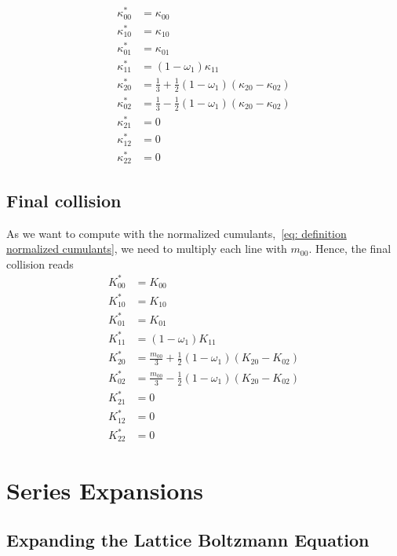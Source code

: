 \documentclass{article}
\begin{document}
\begin{equation}
  \begin{aligned}
    \kappa_{00}^{*} & = \kappa_{00} \\
    \kappa_{10}^{*} & = \kappa_{10} \\
    \kappa_{01}^{*} & = \kappa_{01} \\
    \kappa_{11}^{*} & = (1-\omega_1)\kappa_{11} \\
    \kappa_{20}^{*} & = \frac{1}{3} + \frac{1}{2}(1-\omega_1) (\kappa_{20} - \kappa_{02}) \\
    \kappa_{02}^{*} & = \frac{1}{3} - \frac{1}{2}(1-\omega_1) (\kappa_{20} - \kappa_{02}) \\
    \kappa_{21}^{*} & = 0 \\
    \kappa_{12}^{*} & = 0 \\
    \kappa_{22}^{*} & = 0
  \end{aligned}
\end{equation}

\subsection{Final collision}
\label{sub:Final collision}
As we want to compute with the normalized cumulants,~\eqref{eq: definition normalized cumulants}, we need to multiply each line with $m_{00}$. Hence, the final collision reads
\begin{equation}
  \begin{aligned}
    K_{00}^{*} & = K_{00} \\
    K_{10}^{*} & = K_{10} \\
    K_{01}^{*} & = K_{01} \\
    K_{11}^{*} & = (1-\omega_1)K_{11} \\
    K_{20}^{*} & = \frac{m_{00}}{3} + \frac{1}{2}(1-\omega_1) (K_{20} - K_{02}) \\
    K_{02}^{*} & = \frac{m_{00}}{3} - \frac{1}{2}(1-\omega_1) (K_{20} - K_{02}) \\
    K_{21}^{*} & = 0 \\
    K_{12}^{*} & = 0 \\
    K_{22}^{*} & = 0
  \end{aligned}
\end{equation}

\section{Series Expansions}
\label{sec:Series Expansions}
\subsection{Expanding the Lattice Boltzmann Equation}
\label{sub:Expanding the Lattice Boltzmann Equation}
\end{document}
